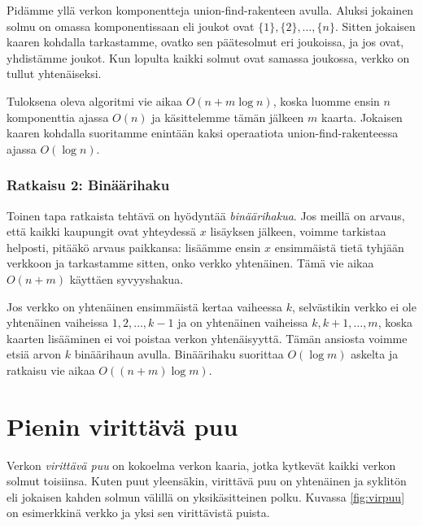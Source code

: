 Pidämme yllä verkon komponentteja
union-find-rakenteen avulla.
Aluksi jokainen solmu on omassa komponentissaan
eli joukot ovat $\{1\},\{2\},\dots,\{n\}$.
Sitten jokaisen kaaren kohdalla tarkastamme,
ovatko sen päätesolmut eri joukoissa,
ja jos ovat, yhdistämme joukot.
Kun lopulta kaikki solmut ovat samassa joukossa,
verkko on tullut yhtenäiseksi.

Tuloksena oleva algoritmi vie aikaa $O(n+m \log n)$,
koska luomme ensin $n$ komponenttia ajassa $O(n)$
ja käsittelemme tämän jälkeen $m$ kaarta.
Jokaisen kaaren kohdalla suoritamme enintään kaksi
operaatiota union-find-rakenteessa ajassa $O(\log n)$.

\subsubsection{Ratkaisu 2: Binäärihaku}

Toinen tapa ratkaista tehtävä on hyödyntää \emph{binäärihakua}.
Jos meillä on arvaus, että kaikki kaupungit ovat yhteydessä
$x$ lisäyksen jälkeen, voimme tarkistaa helposti,
pitääkö arvaus paikkansa:
lisäämme ensin $x$ ensimmäistä tietä tyhjään verkkoon ja tarkastamme
sitten, onko verkko yhtenäinen. Tämä vie aikaa $O(n+m)$
käyttäen syvyyshakua.

Jos verkko on yhtenäinen ensimmäistä kertaa vaiheessa $k$,
selvästikin verkko ei ole yhtenäinen vaiheissa
$1,2,\dots,k-1$ ja on yhtenäinen vaiheissa $k,k+1,\dots,m$,
koska kaarten lisääminen ei voi poistaa verkon yhtenäisyyttä.
Tämän ansiosta voimme etsiä arvon $k$ binäärihaun avulla.
Binäärihaku suorittaa $O(\log m)$ askelta ja ratkaisu vie
aikaa $O((n+m) \log m)$.

\section{Pienin virittävä puu}

Verkon \emph{virittävä puu} on kokoelma verkon kaaria,
jotka kytkevät kaikki verkon solmut toisiinsa.
Kuten puut yleensäkin, virittävä puu on yhtenäinen ja syklitön eli
jokaisen kahden solmun välillä on yksikäsitteinen polku.
Kuvassa \ref{fig:virpuu} on esimerkkinä verkko ja yksi sen virittävistä puista.

